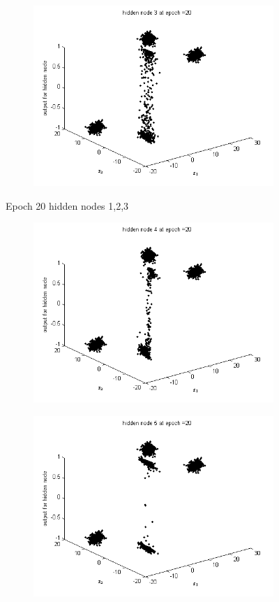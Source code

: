 \documentclass{article}
\begin{document}
\begin{flushleft}
\begin{figure}
\begin{subfigure}{.3\textwidth}
\end{subfigure}
\begin{subfigure}{.3\textwidth}
  \centering
  \includegraphics[width=.8\linewidth]{Classification/linearlySeparable/h20_3}
  
\end{subfigure}
\caption{Epoch 20 hidden nodes 1,2,3}
\end{figure}

\begin{figure}
\begin{subfigure}{.3\textwidth}
  \centering
  \includegraphics[width=.8\linewidth]{Classification/linearlySeparable/h20_4}
 
\end{subfigure}%
\begin{subfigure}{.3\textwidth}
  \centering
  \includegraphics[width=.8\linewidth]{Classification/linearlySeparable/h20_5}
  

\end{subfigure}
\end{figure}
\end{flushleft}
\end{document}
